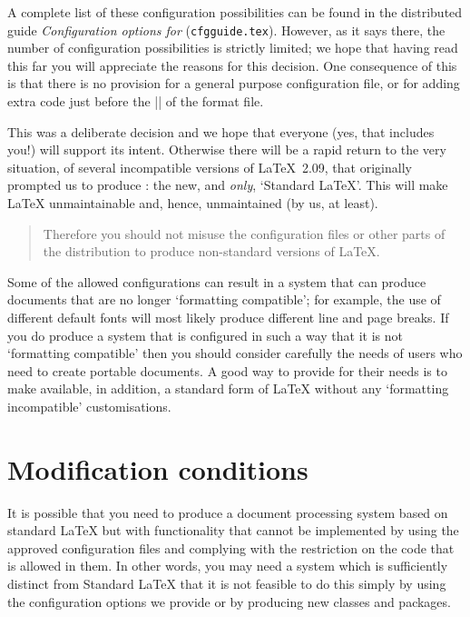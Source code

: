 \documentclass{ltxguide}[1995/11/28]
\begin{document}
A complete list of these configuration possibilities can be found in
the distributed guide \emph{Configuration options for} \LaTeXe{}
(\texttt{cfgguide.tex}).  However, as it says there, the number of
configuration possibilities is strictly limited; we hope that having
read this far you will appreciate the reasons for this decision.  One
consequence of this is that there is no provision for a general
purpose configuration file, or for adding extra code just before the
|\dump| of the format file.

This was a deliberate decision and we hope that everyone (yes, that
includes you!) will support its intent.  Otherwise there will be a
rapid return to the very situation, of several incompatible versions
of \LaTeX~2.09, that originally prompted us to produce \LaTeXe{}: the
new, and \emph{only}, `Standard \LaTeX'.  This will make \LaTeX{}
unmaintainable and, hence, unmaintained (by us, at least).

\begin{quote}
  Therefore you should not misuse the configuration files or other
  parts of the distribution to produce non-standard versions of
  \LaTeX{}.
\end{quote}

Some of the allowed configurations can result in a system that can produce
documents that are no longer `formatting compatible'; for example, the
use of different default fonts will most likely produce different line
and page breaks.  If you do produce a system that is configured in
such a way that it is not `formatting compatible' then you should
consider carefully the needs of users who need to create portable
documents.  A good way to provide for their needs is to make
available, in addition, a standard form of \LaTeX{} without any
`formatting incompatible' customisations.


\section{Modification conditions}
\label{sec:modcon}

It is possible that you need to produce a document processing system
based on standard \LaTeX{} but with functionality that cannot be
implemented by using the approved configuration files and complying
with the restriction on the code that is allowed in them.  In other
words, you may need a system which is sufficiently distinct from
Standard \LaTeX{} that it is not feasible to do this simply by using
the configuration options we provide or by producing new classes and
packages.
\end{document}
